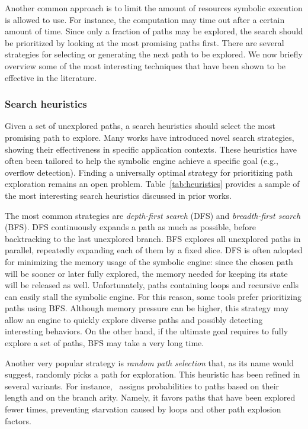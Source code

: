 Another common approach is to limit the amount of resources symbolic execution is allowed to use. For instance, the computation may time out after a certain amount of time. Since only a fraction of paths may be explored, the search should be prioritized by looking at the most promising paths first. There are several strategies for selecting or generating the next path to be explored. We now briefly overview some of the most interesting techniques that have been shown to be effective in the literature. %

\subsubsection{Search heuristics}
\label{sss:search-heuristics}

Given a set of unexplored paths, a search heuristics should select the most promising path to explore. Many works have introduced novel search strategies, showing their effectiveness in specific application contexts. These heuristics have often been tailored to help the symbolic engine achieve a specific goal (e.g., overflow detection). Finding a universally optimal strategy for prioritizing path exploration remains an open problem. Table~\ref{tab:heuristics} provides a sample of the most interesting search heuristics discussed in prior works. 

The most common strategies are {\em depth-first search} (DFS) and {\em breadth-first search} (BFS). DFS continuously expands a path as much as possible, before backtracking to the last unexplored branch. BFS explores all unexplored paths in parallel, repeatedly expanding each of them by a fixed slice. DFS is often adopted for minimizing the memory usage of the symbolic engine: since the chosen path will be sooner or later fully explored, the memory needed for keeping its state will be released as well. Unfortunately, paths containing loops and recursive calls can easily stall the symbolic engine. For this reason, some tools prefer prioritizing paths using BFS. Although memory pressure can be higher, this strategy may allow an engine to quickly explore diverse paths and possibly detecting interesting behaviors. On the other hand, if the ultimate goal requires to fully explore a set of paths, BFS may take a very long time.

Another very popular strategy is {\em random path selection} that, as its name would suggest, randomly picks a path for exploration. This heuristic has been refined in several variants. For instance,~\cite{KLEE-OSDI08} assigns probabilities to paths based on their length and on the branch arity. Namely, it favors paths that have been explored fewer times, preventing starvation caused by loops and other path explosion factors.


